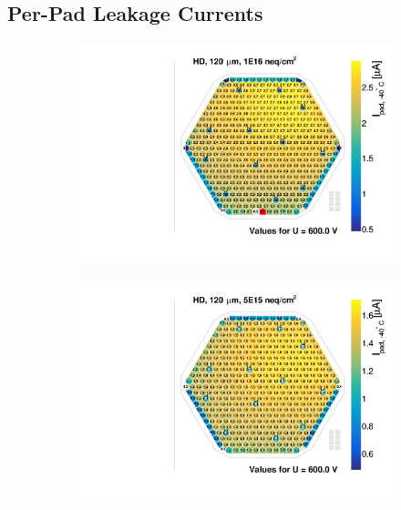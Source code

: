 \subsection{Per-Pad Leakage Currents}
\label{subsec:QA_Ipad}
\begin{figure}
	\captionsetup[subfigure]{aboveskip=-1pt,belowskip=-1pt}
	\centering
	\begin{subfigure}[b]{0.32\textwidth}
		\includegraphics[width=0.999\textwidth]{plots/iv_hexplots/3003.pdf}
		\subcaption{
		}
		\label{plot:iv_hexplot_3003}
	\end{subfigure}
	\hfill
	\begin{subfigure}[b]{0.32\textwidth}
		\includegraphics[width=0.999\textwidth]{plots/iv_hexplots/3009.pdf}
		\subcaption{
		}
		\label{plot:iv_hexplot_3009}
	\end{subfigure}

\end{figure}
